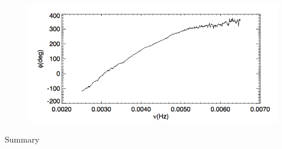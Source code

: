 \documentclass{beamer}
\begin{document}
\begin{frame}
    \begin{figure}
        \includegraphics[width=\textwidth]{fig_11.png}
    \end{figure}
\end{frame}

\begin{frame}{8.12}
\end{frame}

\begin{frame}{8.13}
\end{frame}

\begin{frame}{8.14}
\end{frame}

\begin{frame}{Summary}
\end{frame}

\end{document}
